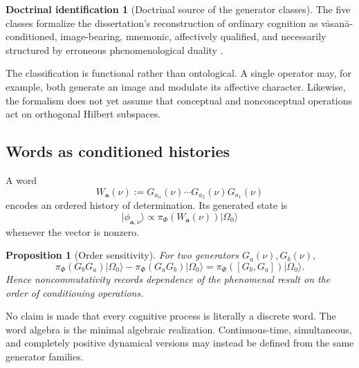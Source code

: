 \documentclass[11pt,reqno]{scrartcl}
\newcommand{\piF}{\pi_{\Phi}}
\newcommand{\ket}[1]{\lvert #1\rangle}
\newcommand{\vas}{\nu}
\theoremstyle{plain}
\newtheorem{proposition}[proposition]{Proposition}
\theoremstyle{definition}
\newtheorem{identification}[identification]{Doctrinal identification}
\theoremstyle{remark}
\begin{document}
\begin{identification}[Doctrinal source of the generator classes]
\label{id:generator-doctrinal-source}
The five classes formalize the dissertation's reconstruction of ordinary
cognition as v\=asan\=a-conditioned, image-bearing, mnemonic, affectively
qualified, and necessarily structured by erroneous phenomenological duality
\cite[pp.~27--32, 64--70, 107--136, 147--156, 414--456]{Yiannopoulos2020}.
\end{identification}

The classification is functional rather than ontological.  A single operator
may, for example, both generate an image and modulate its affective character.
Likewise, the formalism does not yet assume that conceptual and
nonconceptual operations act on orthogonal Hilbert subspaces.

\subsection{Words as conditioned histories}

A word
\begin{equation}
  W_{\mathbf a}(\vas)
  :=G_{a_n}(\vas)\cdots G_{a_2}(\vas)G_{a_1}(\vas)
  \label{eq:conditioned-generator-word}
\end{equation}
encodes an ordered history of determination.  Its generated state is
\begin{equation}
  \ket{\phi_{\mathbf a,\vas}}
  \propto
  \piF(W_{\mathbf a}(\vas))\ket{\Omega_0}
  \label{eq:word-generated-appearance}
\end{equation}
whenever the vector is nonzero.

\begin{proposition}[Order sensitivity]
\label{prop:word-order-sensitivity}
For two generators $G_a(\vas),G_b(\vas)$,
\begin{equation}
  \piF(G_bG_a)\ket{\Omega_0}
  -\piF(G_aG_b)\ket{\Omega_0}
  =\piF([G_b,G_a])\ket{\Omega_0}.
  \label{eq:word-order-commutator}
\end{equation}
Hence noncommutativity records dependence of the phenomenal result on the
order of conditioning operations.
\end{proposition}

No claim is made that every cognitive process is literally a discrete word.
The word algebra is the minimal algebraic realization.  Continuous-time,
simultaneous, and completely positive dynamical versions may instead be
defined from the same generator families.
\end{document}
